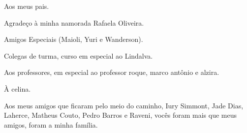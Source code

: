 \begin{agradecimentos}

  Aos meus pais. 

  Agradeço à minha namorada Rafaela Oliveira.

  Amigos Especiais (Maioli, Yuri e Wanderson).

  Colegas de turma, curso em especial ao Lindalva.

  Aos professores, em especial ao professor roque, marco antônio e alzira.

  À celina.

  Aos meus amigos que ficaram pelo meio do caminho, Iury Simmont, Jade Dias, Laherce, Matheus Couto, Pedro Barros e Raveni, vocês foram mais que meus amigos, foram a minha família. 
\end{agradecimentos}
